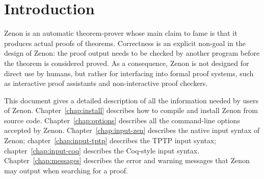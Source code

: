 
\chapter{Introduction}\label{chap:intro}

Zenon is an automatic theorem-prover whose main claim to fame is that
it produces actual proofs of theorems.
Correctness is an explicit non-goal in the design of Zenon: the proof
output needs to be checked by another program before the theorem is
considered proved.
  As a consequence, Zenon is not
designed for direct use by humans, but rather for interfacing into
formal proof systems, such as interactive proof assistants and
non-interactive proof checkers.

This document gives a detailed description of all the information
needed by users of Zenon.  Chapter~\ref{chap:install} describes how to
compile and install Zenon from source code.  Chapter~\ref{chap:options}
describes all the command-line options accepted by Zenon.
Chapter~\ref{chap:input-zen} describes the native input syntax of
Zenon; chapter~\ref{chap:input-tptp} describes the TPTP input syntax;
chapter~\ref{chap:input-coq} describes the Coq-style input
syntax.  Chapter~\ref{chap:messages} describes the error and warning
messages that Zenon may output when searching for a proof.
